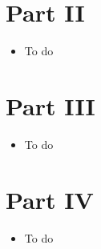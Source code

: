\documentclass{article}
\begin{document}
\section{Part II}

\begin{itemize}
\item To do
\end{itemize}

\section{Part III}

\begin{itemize}
\item To do
\end{itemize}

\section{Part IV}

\begin{itemize}
\item To do
\end{itemize}
\end{document}
